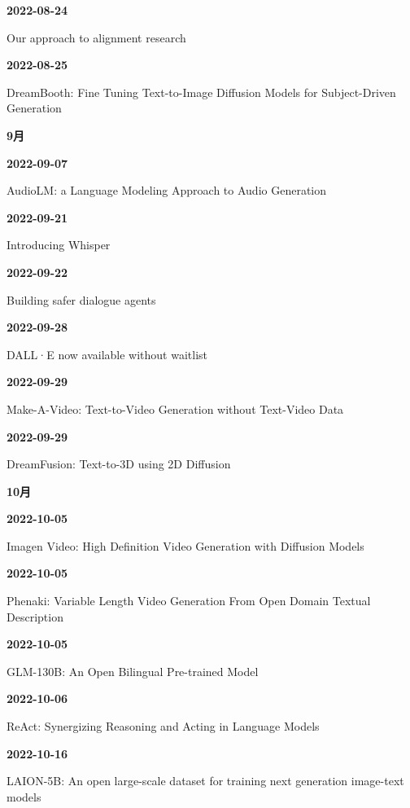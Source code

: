 \smallskip
\noindent\textbf{2022-08-24}\par
{\raggedright Our approach to alignment research\par}
\smallskip
\noindent\textbf{2022-08-25}\par
{\raggedright DreamBooth: Fine Tuning Text-to-Image Diffusion Models for Subject-Driven Generation\par}
\smallskip
\medskip
\noindent\textbf{9月}\par
\smallskip
\noindent\textbf{2022-09-07}\par
{\raggedright AudioLM: a Language Modeling Approach to Audio Generation\par}
\smallskip
\noindent\textbf{2022-09-21}\par
{\raggedright Introducing Whisper\par}
\smallskip
\noindent\textbf{2022-09-22}\par
{\raggedright Building safer dialogue agents\par}
\smallskip
\noindent\textbf{2022-09-28}\par
{\raggedright DALL·E now available without waitlist\par}
\smallskip
\noindent\textbf{2022-09-29}\par
{\raggedright Make-A-Video: Text-to-Video Generation without Text-Video Data\par}
\smallskip
\noindent\textbf{2022-09-29}\par
{\raggedright DreamFusion: Text-to-3D using 2D Diffusion\par}
\smallskip
\medskip
\noindent\textbf{10月}\par
\smallskip
\noindent\textbf{2022-10-05}\par
{\raggedright Imagen Video: High Definition Video Generation with Diffusion Models\par}
\smallskip
\noindent\textbf{2022-10-05}\par
{\raggedright Phenaki: Variable Length Video Generation From Open Domain Textual Description\par}
\smallskip
\noindent\textbf{2022-10-05}\par
{\raggedright GLM-130B: An Open Bilingual Pre-trained Model\par}
\smallskip
\noindent\textbf{2022-10-06}\par
{\raggedright ReAct: Synergizing Reasoning and Acting in Language Models\par}
\smallskip
\noindent\textbf{2022-10-16}\par
{\raggedright LAION-5B: An open large-scale dataset for training next generation image-text models\par}
